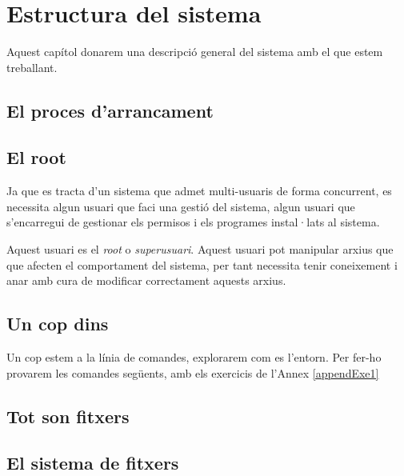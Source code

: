 \section{Estructura del sistema}

Aquest capítol donarem una descripció general del sistema amb el que estem treballant.

\subsection{El proces d'arrancament}

\subsection{El root}

\par
Ja que es tracta d'un sistema que admet multi-usuaris de forma concurrent, es necessita algun usuari que faci una gestió del sistema, algun usuari que s'encarregui de gestionar els permisos i els programes instal·lats al sistema.
\par
Aquest usuari es el \textit{root} o  \textit{superusuari}. Aquest usuari pot manipular arxius que que afecten el comportament del sistema, per tant necessita tenir coneixement i anar amb cura de modificar correctament aquests arxius.

\subsection{Un cop dins}

Un cop estem a la línia de comandes, explorarem com es l'entorn. Per fer-ho provarem les comandes següents, amb els exercicis de l'Annex \ref{appendExe1}


\subsection{Tot son fitxers}

\subsection{El sistema de fitxers}


